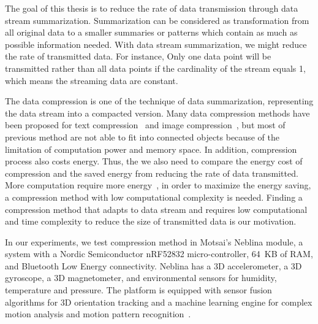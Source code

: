 

The goal of this thesis is to reduce the rate of data transmission through data
stream summarization. Summarization can be considered as transformation from all
original data to a smaller summaries or patterns which contain as much as
possible information needed. With data stream summarization, we might reduce the
rate of transmitted data. For instance, Only one data point will be transmitted
rather than all data points if the cardinality of the stream equals 1, which
means the streaming data are constant. 

The data compression is one of the technique of data summarization, representing
the data stream into a compacted version. Many data compression methods have
been proposed for text compression~\cite{shanmugasundaram2011comparative,
sayood2017introduction} and image compression~\cite{shum2003survey,
zaineldin2015image}, but most of previous method are not able to fit into
connected objects because of the limitation of computation power and memory
space. In addition, compression process also costs energy. Thus, the we also need to compare the energy cost of compression and the saved energy from reducing the rate of data transmitted. More computation require more energy~\cite{pope2018accelerometer}, in order to maximize the energy saving, a compression method with low computational complexity is needed. Finding a compression method that adapts to data stream and requires low computational and time complexity to reduce the size of transmitted data is our motivation.

In our experiments, we test compression method in Motsai's Neblina module, a
system with a Nordic Semiconductor nRF52832 micro-controller, 64~KB of RAM, and
Bluetooth Low Energy connectivity. Neblina has a 3D accelerometer, a 3D
gyroscope, a 3D magnetometer, and environmental sensors for humidity,
temperature and pressure. The platform is equipped with sensor fusion algorithms
for 3D orientation tracking and a machine learning engine for complex motion
analysis and motion pattern recognition~\cite{sarbishei2016accuracy}.





